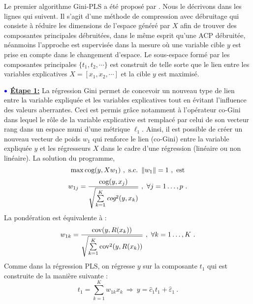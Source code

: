 Le premier algorithme Gini-PLS a été proposé par \citet{mussard2018ginipls}. Nous le décrivons dans les lignes qui suivent. Il s'agit d'une méthode de compression avec débruitage qui consiste à réduire les dimensions de l'espace généré par $X$ afin de trouver des composantes principales débruitées, dans le même esprit qu'une ACP débruitée, néanmoins l'approche est supervisée dans la mesure où une variable cible $y$ est prise en compte dans le changement d'espace. Le sous-espace formé par les composantes principales $\{t_1,t_2,\cdots\}$ est construit de telle sorte que le lien entre les variables explicatives $X = [x_1,x_2,\cdots]$ et la cible $y$ est maximisé.  

\medskip

$\bulle$ \underline{\textbf{Étape 1:}} La régression Gini permet de concevoir un nouveau type de lien entre la variable expliquée et les variables explicatives tout en évitant l'influence des valeurs aberrantes. Ceci est permis grâce notamment à l'opérateur co-Gini dans lequel le rôle de la variable explicative est remplacé par celui de son vecteur rang dans un espace muni d'une métrique $\ell_1$.  Ainsi, il est possible de créer un nouveau vecteur de poids $w_1$ qui renforce le lien (co-Gini) entre la variable expliquée $y$ et les régresseurs $X$ dans le cadre d'une régression (linéaire ou non linéaire).
\newline La solution du programme,
\[
\max \cog(y,X w_1) \ , \ \text{s.c.} \ \left\|w_1\right\|=1 \ , \ \text{est}
\]
\begin{equation}\notag
w_{1j} = \frac{\text{cog}(y,x_j)}{\sqrt{\sum\limits_{k=1}^K \emph{cog}^2(y,x_k)}} \ , \ \forall j = 1\ldots,p \ .
\end{equation}
La pondération est équivalente à :
\begin{equation}\notag
w_{1k} = \frac{\text{cov}(y,R(x_k))}{\sqrt{\sum\limits_{k=1}^K \text{cov}^2(y,R(x_k))}} \ , \ \forall k = 1\ldots,K \ .
\end{equation}
Comme dans la régression PLS, on régresse $y$ sur la composante $t_1$ qui est construite de la manière suivante :
\[
t_1 = \sum_{k=1}^K w_{1k}x_k \ \Longrightarrow \ y = \hat{c}_1 t_1 + \hat{\varepsilon}_1 \ .
\]

\medskip

